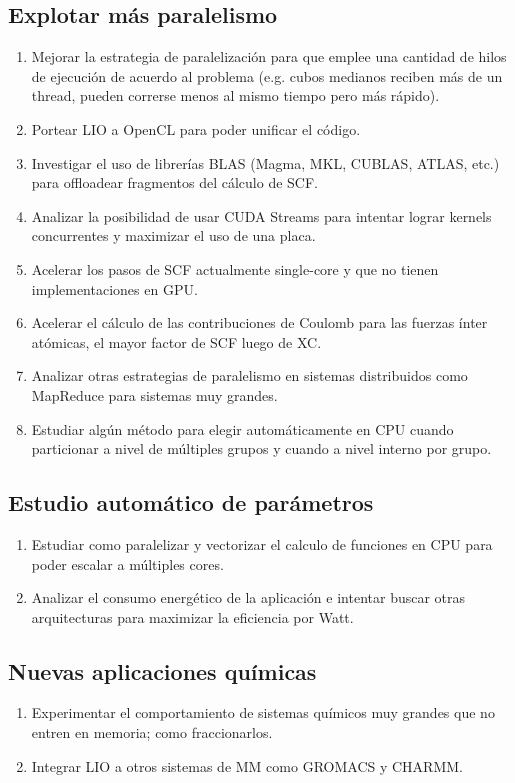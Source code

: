 \subsection{Explotar m\'as paralelismo}
\begin{enumerate}
  \item Mejorar la estrategia de paralelizaci\'on para que emplee una cantidad de
  hilos de ejecuci\'on de acuerdo al problema (e.g. cubos medianos reciben m\'as
  de un thread, pueden correrse menos al mismo tiempo pero m\'as r\'apido).
  \item Portear LIO a OpenCL para poder unificar el c\'odigo.
  \item Investigar el uso de librer\'ias BLAS (Magma, MKL, CUBLAS, ATLAS, etc.) para offloadear fragmentos del
    c\'alculo de SCF.
  \item Analizar la posibilidad de usar CUDA Streams para intentar lograr kernels concurrentes y maximizar
    el uso de una placa.
  \item Acelerar los pasos de SCF actualmente single-core y que no tienen implementaciones en GPU.
  \item Acelerar el c\'alculo de las contribuciones de Coulomb para las fuerzas \'inter at\'omicas, el mayor factor de SCF luego de XC.
  \item Analizar otras estrategias de paralelismo en sistemas distribuidos como MapReduce para sistemas muy grandes.
  \item Estudiar alg\'un m\'etodo para elegir autom\'aticamente en CPU cuando particionar a nivel
    de m\'ultiples grupos y cuando a nivel interno por grupo.
\end{enumerate}

\subsection{Estudio autom\'atico de par\'ametros}
\begin{enumerate}
  \item Estudiar como paralelizar y vectorizar el calculo de funciones en CPU para poder escalar a m\'ultiples cores.
  \item Analizar el consumo energ\'etico de la aplicaci\'on e intentar buscar otras arquitecturas para maximizar
    la eficiencia por Watt.
\end{enumerate}

\subsection{Nuevas aplicaciones qu\'imicas}
\begin{enumerate}
  \item Experimentar el comportamiento de sistemas qu\'imicos muy grandes que no entren en memoria; como fraccionarlos.
  \item Integrar LIO a otros sistemas de MM como GROMACS y CHARMM.
\end{enumerate}
